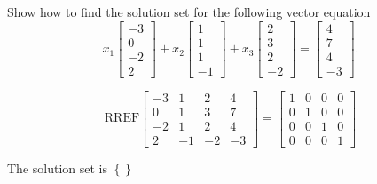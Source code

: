 
\begin{exerciseStatement}


Show how to find the solution set for the following vector equation \[ x_{1} \left[\begin{array}{c}
-3 \\
0 \\
-2 \\
2
\end{array}\right] + x_{2} \left[\begin{array}{c}
1 \\
1 \\
1 \\
-1
\end{array}\right] + x_{3} \left[\begin{array}{c}
2 \\
3 \\
2 \\
-2
\end{array}\right] = \left[\begin{array}{c}
4 \\
7 \\
4 \\
-3
\end{array}\right] .\]


\end{exerciseStatement}
    
\begin{exerciseAnswer} 
\[\mathrm{RREF} \left[\begin{array}{ccc|c}
-3 & 1 & 2 & 4 \\
0 & 1 & 3 & 7 \\
-2 & 1 & 2 & 4 \\
2 & -1 & -2 & -3
\end{array}\right]  =  \left[\begin{array}{ccc|c}
1 & 0 & 0 & 0 \\
0 & 1 & 0 & 0 \\
0 & 0 & 1 & 0 \\
0 & 0 & 0 & 1
\end{array}\right] \]

The solution set is \( \left\{\right\} \)


\end{exerciseAnswer}
    
